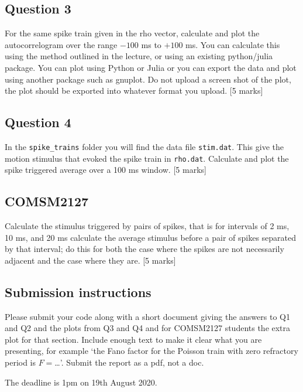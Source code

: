 \documentclass[12pt]{article}
\begin{document}
\subsection*{Question 3}
For the same spike train given in the rho vector, calculate and plot the autocorrelogram over the range $-100$ ms to $+100$ ms. You can calculate this using the method outlined in the lecture, or using an existing python/julia package. You can plot using Python or Julia or you can export the data and plot using another package such as gnuplot. Do not upload a screen shot of the plot, the plot should be exported into whatever format you upload. [5 marks]

\subsection*{Question 4} 

In the \texttt{spike\_trains} folder you will find the data file
\texttt{stim.dat}. This give the motion stimulus that evoked the spike
train in \texttt{rho.dat}. Calculate and plot the spike triggered
average over a 100 ms window.  [5 marks]

\subsection*{COMSM2127}

Calculate the stimulus triggered by pairs of spikes, that is for
intervals of 2 ms, 10 ms, and 20 ms calculate the average
stimulus before a pair of spikes separated by that interval; do this
for both the case where the spikes are not necessarily adjacent and
the case where they are. [5 marks]

\subsection*{Submission instructions}

Please submit your code along with a short document giving the answers
to Q1 and Q2 and the plots from Q3 and Q4 and for COMSM2127 students the extra
plot for that section. Include enough text to make it clear what you
are presenting, for example \lq{}the Fano factor for the Poisson train
with zero refractory period is $F=$\ldots\rq{}. Submit the report as
a pdf, not a doc.

The deadline is 1pm on 19th August 2020.
\end{document}
